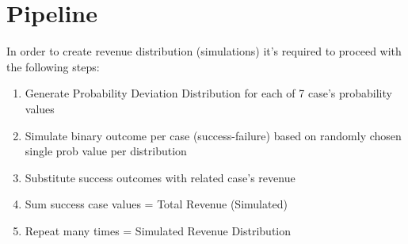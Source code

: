 \documentclass[]{article}
\newenvironment{Shaded}{\begin{snugshade}}{\end{snugshade}}
\newcommand{\DataTypeTok}[1]{\textcolor[rgb]{0.13,0.29,0.53}{#1}}
\newcommand{\DecValTok}[1]{\textcolor[rgb]{0.00,0.00,0.81}{#1}}
\newcommand{\FloatTok}[1]{\textcolor[rgb]{0.00,0.00,0.81}{#1}}
\newcommand{\KeywordTok}[1]{\textcolor[rgb]{0.13,0.29,0.53}{\textbf{#1}}}
\newcommand{\NormalTok}[1]{#1}
\newcommand{\OperatorTok}[1]{\textcolor[rgb]{0.81,0.36,0.00}{\textbf{#1}}}
\newcommand{\OtherTok}[1]{\textcolor[rgb]{0.56,0.35,0.01}{#1}}
\newcommand{\StringTok}[1]{\textcolor[rgb]{0.31,0.60,0.02}{#1}}
\providecommand{\tightlist}{%
  \setlength{\itemsep}{0pt}\setlength{\parskip}{0pt}}
\begin{document}
\begin{Shaded}
\end{Shaded}

\newpage

\hypertarget{pipeline}{%
\section{Pipeline}\label{pipeline}}

In order to create revenue distribution (simulations) it's required to
proceed with the following steps:

\begin{enumerate}
\def\labelenumi{\alph{enumi})}
\tightlist
\item
  Generate Probability Deviation Distribution for each of 7 case's
  probability values
\item
  Simulate binary outcome per case (success-failure) based on randomly
  chosen single prob value per distribution
\item
  Substitute success outcomes with related case's revenue
\item
  Sum success case values = Total Revenue (Simulated)
\item
  Repeat many times = Simulated Revenue Distribution
\end{enumerate}
\end{document}
